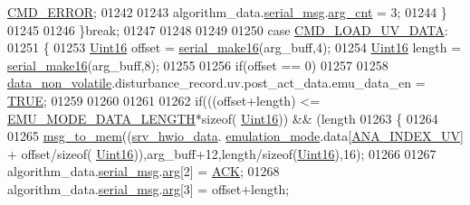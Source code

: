 \begin{DoxyCode}
{{{{{      \hyperlink{a00021_a1764a522e9c1a59a59be8757c69fa494}{CMD\_ERROR};
01242 
01243                          algorithm\_data.\hyperlink{a00016_afcf5f557aea688aad985eec15269c1da}{serial\_msg}.\hyperlink{a00031_a7b79f40e2eeec288091afd340bf8f591}{arg\_cnt} = 3;
01244                      \}
01245 
01246                 \}\textcolor{keywordflow}{break};
01247                 
01248 
01249 
01250                   \textcolor{keywordflow}{case}  \hyperlink{a00021_a8904f57ef5850374dbcdbe67eb8a5543}{CMD\_LOAD\_UV\_DATA}:
01251                 \{
01253                     \hyperlink{a00072_a59a9f6be4562c327cbfb4f7e8e18f08b}{Uint16} offset = \hyperlink{a00031_abc17de32f14103a5be219df0d4ad9176}{serial\_make16}(arg\_buff,4);
01254                     \hyperlink{a00072_a59a9f6be4562c327cbfb4f7e8e18f08b}{Uint16} length = \hyperlink{a00031_abc17de32f14103a5be219df0d4ad9176}{serial\_make16}(arg\_buff,8);
01255 
01256                     \textcolor{keywordflow}{if}(offset == 0)
01257 
01258                         \hyperlink{a00060_a76ac5f917f5308dcd83de0d7c94559fb}{data\_non\_volatile}.disturbance\_record.uv.post\_act\_data.emu\_data\_en 
      = \hyperlink{a00040_aa8cecfc5c5c054d2875c03e77b7be15d}{TRUE};
01259 
01260 
01261                     
01262                      \textcolor{keywordflow}{if}(((offset+length) <= \hyperlink{a00022_af4c3a8ad94feb4d7bda7f107f34baf41}{EMU\_MODE\_DATA\_LENGTH}*\textcolor{keyword}{sizeof}(
      \hyperlink{a00072_a59a9f6be4562c327cbfb4f7e8e18f08b}{Uint16})) && (length%
01263                       \{
01264 
01265                        \hyperlink{a00038_a126f3d78a95341a19a3e862e57357952}{msg\_to\_mem}((\hyperlink{a00034_a0fd91014631926f362c7c2b2f5d143b0}{srv\_hwio\_data}.
      \hyperlink{a00034_a742dceaef1f19ec73ed5acc066127476}{emulation\_mode}.data[\hyperlink{a00058_af523b82e94e382153f1313307c5bd879}{ANA\_INDEX\_UV}] + offset/\textcolor{keyword}{sizeof}(
      \hyperlink{a00072_a59a9f6be4562c327cbfb4f7e8e18f08b}{Uint16})),arg\_buff+12,length/\textcolor{keyword}{sizeof}(\hyperlink{a00072_a59a9f6be4562c327cbfb4f7e8e18f08b}{Uint16}),16);
01266 
01267                          algorithm\_data.\hyperlink{a00016_afcf5f557aea688aad985eec15269c1da}{serial\_msg}.\hyperlink{a00031_af7d6f762438c80072bd9dc0e4dd4ae1e}{arg}[2] = \hyperlink{a00021_a6f6489887e08bff4887d0bc5dcf214d8}{ACK};
01268                          algorithm\_data.\hyperlink{a00016_afcf5f557aea688aad985eec15269c1da}{serial\_msg}.\hyperlink{a00031_af7d6f762438c80072bd9dc0e4dd4ae1e}{arg}[3] = offset+length;
}}}}}
\end{DoxyCode}
